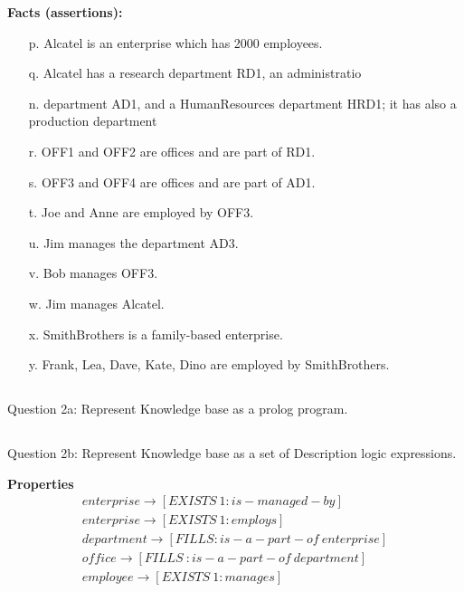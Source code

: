 \documentclass[11pt]{article}
\begin{document}
\noindent\textbf{Facts (assertions):}
\begin{itemize}
    \item[p.] Alcatel is an enterprise which has 2000 employees.
    \item[q.] Alcatel has a research department RD1, an administratio
    \item[n.] department AD1, and a HumanResources department HRD1; it has also a production department
    \item[r.] OFF1 and OFF2 are offices and are part of RD1.
    \item[s.] OFF3 and OFF4 are offices and are part of AD1.
    \item[t.] Joe and Anne are employed by OFF3.
    \item[u.] Jim manages the department AD3.
    \item[v.] Bob manages OFF3.
    \item[w.] Jim manages Alcatel.
    \item[x.] SmithBrothers is a family-based enterprise.
    \item[y.] Frank, Lea, Dave, Kate, Dino are employed by SmithBrothers.
\end{itemize}

\subsection{}
Question 2a:
Represent Knowledge base as a prolog program.

\subsection{}
Question 2b:
Represent Knowledge base as a set of Description logic expressions.

\textbf{Properties}
\begin{align*}
	enterprise \rightarrow [EXISTS\ 1 :is-managed-by] \\
	enterprise \rightarrow [EXISTS\ 1 :employs] \\
	department \rightarrow[FILLS :is-a-part-of\ enterprise] \\
	office \rightarrow [FILLS\ :is-a-part-of\ department] \\
	employee \rightarrow [EXISTS\ 1 :manages]
\end{align*}
\end{document}
